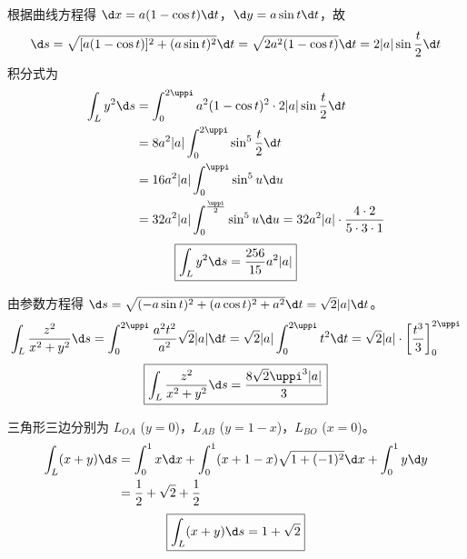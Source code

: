 \begin{solution}

    根据曲线方程得 $\d x = a(1-\cos t) \d t$，$\d y = a \sin t \d t$，故
    \begin{equation}
        \d s = \sqrt{[a(1-\cos t)]^{2}+(a \sin t)^{2}} \d t = \sqrt{2 a^{2}(1-\cos t)} \d t = 2 |a| \sin \frac{t}{2} \d t
    \end{equation}
    积分式为
    \begin{equation}
        \begin{aligned}
            \int_{L} y^{2} \d s & = \int_{0}^{2 \uppi} a^{2}(1-\cos t)^{2} \cdot 2 |a| \sin \frac{t}{2} \d t                                         \\
                                & = 8 a^{2} |a| \int_{0}^{2 \uppi} \sin^{5} \frac{t}{2} \d t                                                         \\
                                & = 16 a^{2} |a| \int_{0}^{\uppi} \sin^{5} u \d u                                                                    \\
                                & = 32 a^{2} |a| \int_{0}^{\frac{\uppi}{2}} \sin^{5} u \d u = 32 a^{2} |a| \cdot \frac{4 \cdot 2}{5 \cdot 3 \cdot 1}
        \end{aligned}
    \end{equation}
    \begin{equation}
        \boxed{\int_{L} y^{2} \d s = \frac{256}{15} a^{2} |a| }
    \end{equation}


    由参数方程得 $\d s = \sqrt{(-a \sin t)^{2}+(a \cos t)^{2}+a^{2}} \d t = \sqrt{2} |a| \d t$。
    \begin{equation}
        \int_{L} \frac{z^{2}}{x^{2}+y^{2}} \d s = \int_{0}^{2 \uppi} \frac{a^{2} t^{2}}{a^{2}} \sqrt{2} |a| \d t = \sqrt{2} |a| \int_{0}^{2 \uppi} t^{2} \d t = \sqrt{2} |a| \cdot \left[ \frac{t^{3}}{3} \right]_{0}^{2 \uppi}
    \end{equation}
    \begin{equation}
        \boxed{\int_{L} \frac{z^{2}}{x^{2}+y^{2}} \d s = \frac{8 \sqrt{2} \uppi^{3} |a| }{3}}
    \end{equation}


    三角形三边分别为 $L_{OA}$ ($y=0$)，$L_{AB}$ ($y=1-x$)，$L_{BO}$ ($x=0$)。
    \begin{equation}
        \begin{aligned}
            \int_{L}(x+y) \d s & = \int_{0}^{1} x \d x + \int_{0}^{1}(x+1-x) \sqrt{1+(-1)^{2}} \d x + \int_{0}^{1} y \d y \\
                               & = \frac{1}{2} + \sqrt{2} + \frac{1}{2}
        \end{aligned}
    \end{equation}
    \begin{equation}
        \boxed{\int_{L}(x+y) \d s = 1+\sqrt{2}}
    \end{equation}


\end{solution}
